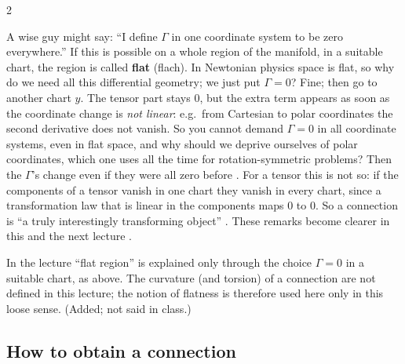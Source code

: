 \begin{paracol}{2}
\begin{intuition}
A wise guy might say: ``I define $\Gamma$ in one coordinate system to be zero everywhere.'' If this is possible on a whole region
of the manifold, in a suitable chart, the region is called \textbf{flat} (flach). In Newtonian physics space is flat, so why
do we need all this differential geometry; we just put $\Gamma=0$? Fine; then go to another chart $y$. The tensor part stays $0$, but
the extra term appears as soon as the coordinate change is \emph{not linear}: e.g.\ from Cartesian to polar coordinates the
second derivative does not vanish. So you cannot demand $\Gamma=0$ in all coordinate systems, even in flat space, and why
should we deprive ourselves of polar coordinates, which one uses all the time for rotation-symmetric problems? Then the $\Gamma$'s
change even if they were all zero before .
For a tensor this is not so: if the components of a tensor vanish in one chart they vanish in every chart, since a transformation
law that is linear in the components maps $0$ to $0$. So a connection is ``a truly interestingly transforming object''
. These remarks become clearer in this and the next lecture .
\end{intuition}
\begin{coursenote}
In the lecture ``flat region'' is explained only through the choice $\Gamma=0$ in a suitable chart, as above. The curvature
(and torsion) of a connection are not defined in this lecture; the notion of flatness is therefore used here only in
this loose sense. (Added; not said in class.)
\end{coursenote}

\subsection{How to obtain a connection}\label{ssec:cf-obtain}


\end{paracol}
